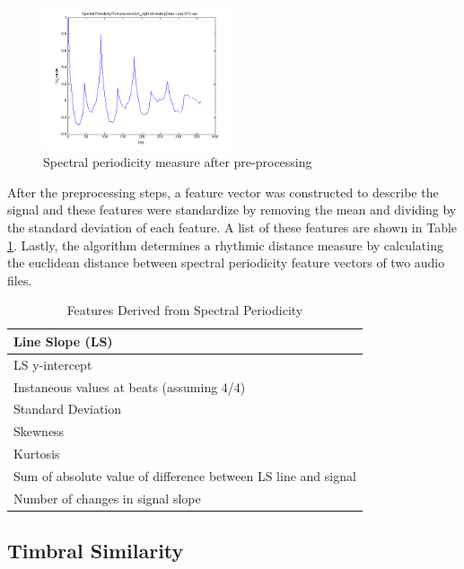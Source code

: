 \documentclass{article}
\begin{document}
\begin{figure}[h!]
 \centering
	\centerline{\includegraphics[width=0.5\textwidth]{bs_post.png}}
      \caption{Spectral periodicity measure after pre-processing}	\label{fig:bs1_post}
\end{figure}

After the preprocessing steps, a feature vector was constructed to describe the signal and these features were standardize by removing the mean and dividing by the standard deviation of each feature. A list of these features are shown in Table \ref{tab:bs_feat}. Lastly, the algorithm determines a rhythmic distance measure by calculating the euclidean distance between spectral periodicity feature vectors of two audio files.

\begin{table}[h!]
  \begin{center}
    \begin{tabular}{| p{7.0cm} |}
    \hline
    Line Slope (LS) \\
    \hline
	LS y-intercept\\
	    \hline
	Instaneous values at beats (assuming 4/4) \\
	    \hline
	Standard Deviation \\
	    \hline
	Skewness \\
	    \hline
	Kurtosis \\
	    \hline
	Sum of absolute value of difference between LS line and signal \\
	    \hline
	Number of changes in signal slope \\    \hline
    \end{tabular}
  \end{center}
  \caption{Features Derived from Spectral Periodicity}\label{tab:bs_feat}
\end{table}
    

\subsection{Timbral Similarity}
\end{document}
